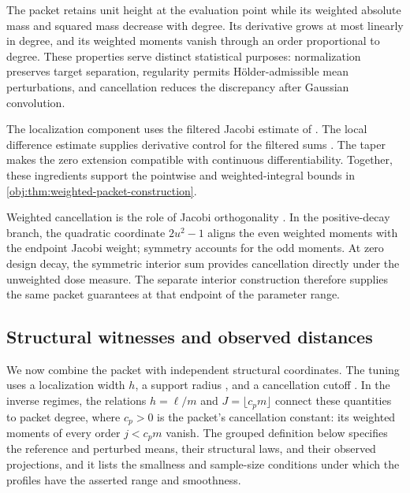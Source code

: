 \documentclass[11pt]{article}
\begin{document}
The packet retains unit height at the evaluation point while its weighted absolute mass and squared mass decrease with degree. Its derivative grows at most linearly in degree, and its weighted moments vanish through an order proportional to degree. These properties serve distinct statistical purposes: normalization preserves target separation, regularity permits Hölder-admissible mean perturbations, and cancellation reduces the discrepancy after Gaussian convolution.

The localization component uses the filtered Jacobi estimate of \citet[Theorem 2.4, equation (2.14)]{PetrushevXu2005}. The local difference estimate supplies derivative control for the filtered sums \citep[Theorem 2.2, equation (2.4)]{https://people.math.sc.edu/pencho/Publications/kpx-06-28-06-web.pdf}. The taper makes the zero extension compatible with continuous differentiability. Together, these ingredients support the pointwise and weighted-integral bounds in \cref{obj:thm:weighted-packet-construction}.

Weighted cancellation is the role of Jacobi orthogonality \citep[Table 18.3.1, Jacobi row and caption]{https://dlmf.nist.gov/18.3}. In the positive-decay branch, the quadratic coordinate \(2u^2-1\) aligns the even weighted moments with the endpoint Jacobi weight; symmetry accounts for the odd moments. At zero design decay, the symmetric interior sum provides cancellation directly under the unweighted dose measure. The separate interior construction therefore supplies the same packet guarantees at that endpoint of the parameter range.

\subsection{Structural witnesses and observed distances}

We now combine the packet with independent structural coordinates. The tuning uses a localization width \(h\), a support radius , and a cancellation cutoff . In the inverse regimes, the relations \(h=\ell/m\) and \(J=\lfloor c_pm\rfloor\) connect these quantities to packet degree, where \(c_p>0\) is the packet's cancellation constant: its weighted moments of every order \(j<c_pm\) vanish. The grouped definition below specifies the reference and perturbed means, their structural laws, and their observed projections, and it lists the smallness and sample-size conditions under which the profiles have the asserted range and smoothness.
\end{document}
